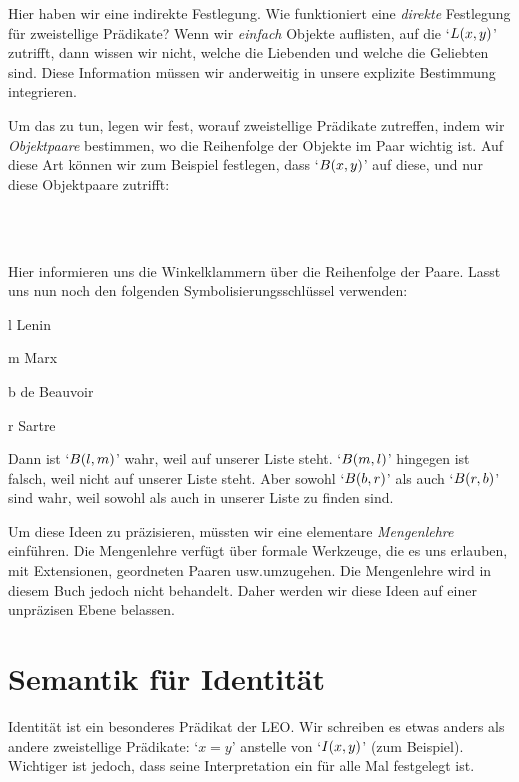 Hier haben wir eine indirekte Festlegung. Wie funktioniert eine \emph{direkte} Festlegung für zweistellige Prädikate? Wenn wir \emph{einfach} Objekte auflisten, auf die `$\mathord{L}(x,y)$' zutrifft, dann wissen wir nicht, welche die Liebenden und welche die Geliebten sind. Diese Information müssen wir anderweitig in unsere explizite Bestimmung integrieren.

Um das zu tun, legen wir fest, worauf zweistellige Prädikate zutreffen, indem wir \emph{Objektpaare} bestimmen, wo die Reihenfolge der Objekte im Paar wichtig ist. Auf diese Art können wir zum Beispiel festlegen, dass `$\mathord{B}(x,y)$' auf diese, und nur diese Objektpaare zutrifft:
	\begin{center}
		\\
		\\
	\end{center}
Hier informieren uns die Winkelklammern über die Reihenfolge der Paare. Lasst uns nun noch den folgenden Symbolisierungsschlüssel verwenden:
	\begin{ekey}
		\item[l] Lenin
		\item[m] Marx
		\item[b] de Beauvoir
		\item[r] Sartre
	\end{ekey}
Dann ist `$\mathord{B}(l,m)$' wahr, weil  auf unserer Liste steht. `$\mathord{B}(m,l)$' hingegen ist falsch, weil  nicht auf unserer Liste steht. Aber sowohl `$\mathord{B}(b,r)$' als auch `$\mathord{B}(r,b)$' sind wahr, weil sowohl  als auch  in unserer Liste zu finden sind.

Um diese Ideen zu präzisieren, müssten wir eine elementare \emph{Mengenlehre} einführen. Die Mengenlehre verfügt über formale Werkzeuge, die es uns erlauben, mit Extensionen, geordneten Paaren usw.\@ umzugehen. Die Mengenlehre wird in diesem Buch jedoch nicht behandelt. Daher werden wir diese Ideen auf einer unpräzisen Ebene belassen.

\section{Semantik für Identität}
Identität ist ein besonderes Prädikat der LEO. Wir schreiben es etwas anders als andere zweistellige Prädikate: `$x=y$' anstelle von `$\mathord{I}(x,y)$' (zum Beispiel). Wichtiger ist jedoch, dass seine Interpretation ein für alle Mal festgelegt ist. 

